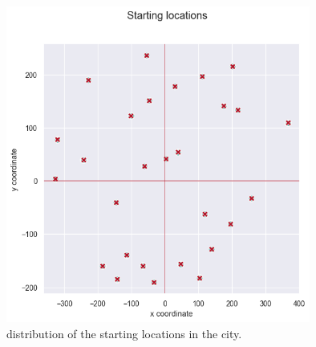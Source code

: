 \begin{figure}[h]
	\centering
	\includegraphics[width=100mm]{figures/starting_locations.png}
	\caption{distribution of the starting locations in the city.}
	\label{fig:starting_locs}
\end{figure}



